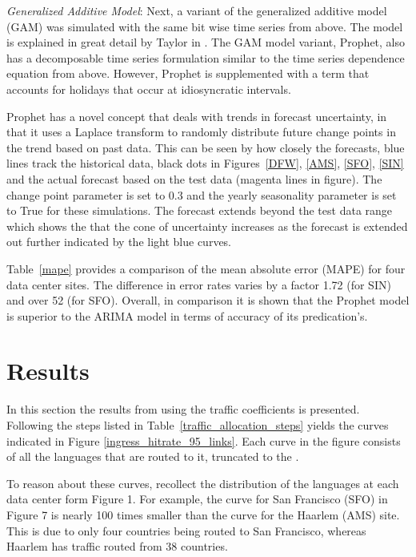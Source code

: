     
    
    \emph{Generalized Additive Model}: Next, a variant of the generalized additive model (GAM) was simulated with the same bit wise time series from above. The model is explained in great detail by Taylor in \cite{fbprophet}. The GAM model variant, Prophet, also has a decomposable time series formulation similar to the time series dependence equation from above. However, Prophet is supplemented with a term that accounts for holidays that occur at idiosyncratic  intervals. 
    
    Prophet has a novel concept that deals with trends in forecast uncertainty, in that it uses a Laplace transform to randomly distribute future change points in the trend based on past data. This can be seen by how closely the forecasts, blue lines track the historical data, black dots in Figures~\ref{DFW}, \ref{AMS}, \ref{SFO}, \ref{SIN} and the actual forecast based on the test data (magenta lines in figure). The change point parameter is set to 0.3 and the yearly seasonality parameter is set to True for these simulations. The forecast extends beyond the test data range which shows the that the cone of uncertainty increases as the forecast is extended out further indicated by the light blue curves. 
    
    
    
    
    
    Table~\ref{mape} provides a comparison of the mean absolute error (MAPE) for four data center sites. The difference in error rates varies by a factor 1.72 (for SIN) and over 52 (for SFO). Overall, in comparison it is shown that the Prophet model is superior to the ARIMA model in terms of accuracy of its predication's. 
    
    
\section {Results}

    In this section the results from using the traffic coefficients is presented. Following the steps listed in Table~\ref{traffic_allocation_steps} yields the curves indicated in Figure \ref{ingress_hitrate_95_links}. Each curve in the figure consists of all the languages that are routed to it, truncated to the . 
    
    To reason about these curves, recollect the distribution of the languages at each data center form Figure 1. For example, the curve for San Francisco (SFO) in Figure 7 is nearly 100 times smaller than the curve for the Haarlem (AMS) site. This is due to only four countries being routed to San Francisco, whereas Haarlem has traffic routed from 38 countries. 
    
